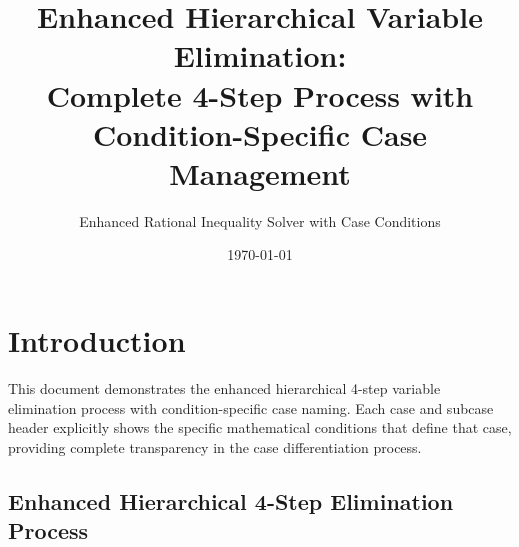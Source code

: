 \documentclass{article}
\title{Enhanced Hierarchical Variable Elimination: \\
Complete 4-Step Process with Condition-Specific Case Management}
\author{Enhanced Rational Inequality Solver with Case Conditions}
\date{\today}
\begin{document}
\maketitle

\section{Introduction}

This document demonstrates the enhanced hierarchical 4-step variable elimination process
with condition-specific case naming. Each case and subcase header explicitly shows the
specific mathematical conditions that define that case, providing complete transparency
in the case differentiation process.

\subsection{Enhanced Hierarchical 4-Step Elimination Process}
\end{document}

